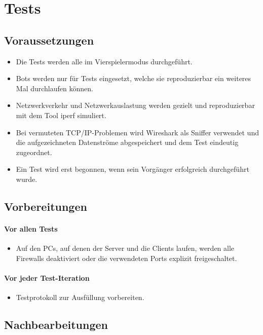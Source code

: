 \documentclass[12pt,halfparskip]{scrartcl}
\begin{document}
\section{Tests}
\subsection{Voraussetzungen}
\begin{itemize}
	\item Die Tests werden alle im Vierspielermodus durchgeführt.
	\item Bots werden nur für Tests eingesetzt, welche sie reproduzierbar ein weiteres Mal durchlaufen können.
	\item Netzwerkverkehr und Netzwerkauslastung werden gezielt und reproduzierbar mit dem Tool iperf simuliert.
	\item Bei vermuteten TCP/IP-Problemen wird Wireshark als Sniffer verwendet und die aufgezeichneten Datenströme abgespeichert und dem Test eindeutig zugeordnet.
	\item Ein Test wird erst begonnen, wenn sein Vorgänger erfolgreich durchgeführt wurde.
\end{itemize}

\subsection{Vorbereitungen}
\paragraph{Vor allen Tests}\label{ssub:vorbereitungen_vor_allen_tests} 
	\begin{itemize}
		\item Auf den PCs, auf denen der Server und die Clients laufen, werden alle Firewalls deaktiviert oder die verwendeten Ports explizit freigeschaltet.
	\end{itemize}

\paragraph{Vor jeder Test-Iteration}\label{ssub:vorbereitungen_vor_jeder_testiteration}
	\begin{itemize}
		\item Testprotokoll zur Ausfüllung vorbereiten.
	\end{itemize}

\subsection{Nachbearbeitungen}\label{sec:nachbearbeitungen}
\end{document}
